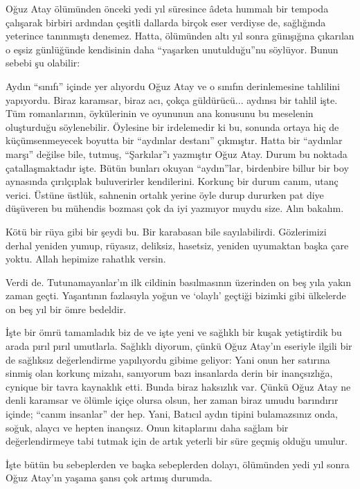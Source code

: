 \documentclass[a5paper,13pt]{scrbook}
\begin{document}
Oğuz Atay ölümünden önceki yedi yıl süresince âdeta hummalı bir tempoda
çalışarak birbiri ardından çeşitli dallarda birçok eser verdiyse de, sağlığında
yeterince tanınmıştı denemez. Hatta, ölümünden altı yıl sonra günışığına
çıkarılan o eşsiz günlüğünde kendisinin daha ``yaşarken unutulduğu''nu söylüyor.
Bunun sebebi şu olabilir:

Aydın ``sınıfı'' içinde yer alıyordu Oğuz Atay ve o sınıfın derinlemesine
tahlilini yapıyordu. Biraz karamsar, biraz acı, çokça güldürücü... aydınsı bir
tahlil işte. Tüm romanlarının, öykülerinin ve oyununun ana konusunu bu meselenin
oluşturduğu söylenebilir. Öylesine bir irdelemedir ki bu, sonunda ortaya hiç de
küçümsenmeyecek boyutta bir ``aydınlar destanı'' çıkmıştır. Hatta bir ``aydınlar
marşı'' değilse bile, tutmuş, ``Şarkılar''ı yazmıştır Oğuz Atay. Durum bu noktada
çatallaşmaktadır işte. Bütün bunları okuyan ``aydın''lar, birdenbire billur bir
boy aynasında çırılçıplak buluverirler kendilerini. Korkunç bir durum canım,
utanç verici. Üstüne üstlük, sahnenin ortalık yerine öyle durup dururken pat
diye düşüveren bu mühendis bozması çok da iyi yazmıyor muydu size. Alın bakalım.

Kötü bir rüya gibi bir şeydi bu. Bir karabasan bile sayılabilirdi. Gözlerimizi
derhal yeniden yumup, rüyasız, deliksiz, hasetsiz, yeniden uyumaktan başka çare
yoktu. Allah hepimize rahatlık versin.

Verdi de. Tutunamayanlar'ın ilk cildinin basılmasının üzerinden on beş yıla
yakın zaman geçti. Yaşantının fazlasıyla yoğun ve `olaylı' geçtiği bizimki gibi
ülkelerde on beş yıl bir ömre bedeldir.

İşte bir ömrü tamamladık biz de ve işte yeni ve sağlıklı bir kuşak yetiştirdik
bu arada pırıl pırıl umutlarla. Sağlıklı diyorum, çünkü Oğuz Atay'ın eseriyle
ilgili bir de sağlıksız değerlendirme yapılıyordu gibime geliyor: Yani onun her
satırına sinmiş olan korkunç mizahı, sanıyorum bazı insanlarda derin bir
inançsızlığa, cynique bir tavra kaynaklık etti. Bunda biraz haksızlık var. Çünkü
Oğuz Atay ne denli karamsar ve ölümle içiçe olursa olsun, her zaman biraz umudu
barındırır içinde; ``canım insanlar'' der hep. Yani, Batıcıl aydın tipini
bulamazsınız onda, soğuk, alaycı ve hepten inançsız. Onun kitaplarını daha
sağlam bir değerlendirmeye tabi tutmak için de artık yeterli bir süre geçmiş
olduğu umulur.

İşte bütün bu sebeplerden ve başka sebeplerden dolayı, ölümünden yedi yıl sonra
Oğuz Atay'ın yaşama şansı çok artmış durumda.
\end{document}
